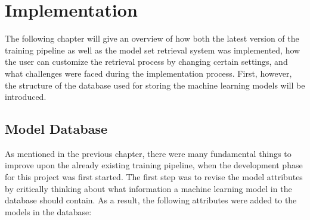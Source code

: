 \chapter{Implementation}\label{chap:implementation}

The following chapter will give an overview of how both the latest version of the training pipeline as well as the model set retrieval system was implemented, how the user can customize the retrieval process by changing certain settings, and what challenges were faced during the implementation process. First, however, the structure of the database used for storing the machine learning models will be introduced.



\section{Model Database}

As mentioned in the previous chapter, there were many fundamental things to improve upon the already existing training pipeline, when the development phase for this project was first started. The first step was to revise the model attributes by critically thinking about what information a machine learning model in the database should contain. As a result, the following attributes were added to the models in the database:

